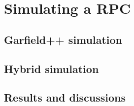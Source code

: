 \graphicspath{{chapt_dutch/}{intro/}{chapt2/}{chapt3/}{chapt4/}{chapt5/}{chapt6/}{chapt7/}{chapt8/}}

\renewcommand\evenpagerightmark{{\scshape\small Chapter 7}}
\renewcommand\oddpageleftmark{{\scshape\small Simulating a RPC}}

\hyphenation{}

\chapter[Simulating a RPC]%
{Simulating a RPC}
\label{chapt:7}

\section{Garfield++ simulation}
\label{sec:garfield}

\section{Hybrid simulation}
\label{sec:hybrid}

\section{Results and discussions}
\label{sec:results7}


\clearpage{\pagestyle{empty}\cleardoublepage}